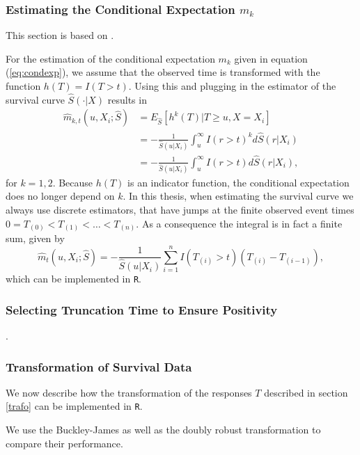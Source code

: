 \documentclass[12pt, a4paper]{scrartcl}
\theoremstyle{definition}
\theoremstyle{plain}
\numberwithin{equation}{section}
\numberwithin{figure}{section}
\numberwithin{table}{section}
\begin{document}
	\subsubsection{Estimating the Conditional Expectation $m_k$}
	
	This section is based on \citet*{drtrees}.
	
	For the estimation of the conditional expectation $m_k$ given in equation (\ref{eq:condexp}), we assume that the observed time is transformed with the function $h(T) = I(T>t)$.
	Using this and plugging in the estimator of the survival curve $\hat{S}(\cdot\vert X)$ results in
	\begin{equation*}
	\begin{split}
	\hat{m}_{k,t} (u, X_i; \hat{S}) &= E_{\hat{S}}[h^k(T)\vert T \geq u, X=X_i]\\
	&=-\frac{1}{\hat{S}(u\vert X_i)}\int_u^{\infty}I(r> t)^kd\hat{S}(r\vert X_i)\\
	&=-\frac{1}{\hat{S}(u\vert X_i)}\int_u^{\infty}I(r> t)d\hat{S}(r\vert X_i),
	\end{split}
	\end{equation*}
	for $k=1,2$.
	Because $h(T)$ is an indicator function, the conditional expectation does no longer depend on $k$.
	In this thesis, when estimating the survival curve we always use discrete estimators, that have jumps at the finite observed event times $0=T_{(0)}<T_{(1)}<\dots<T_{(n)}$.
	As a consequence the integral is in fact a finite sum, given by
	\begin{equation*}
	\hat{m}_t (u, X_i; \hat{S}) = -\frac{1}{\hat{S}(u\vert X_i)}\sum_{i=1}^n I(T_{(i)}>t)(T_{(i)}-T_{(i-1)}),
	\end{equation*}
	which can be implemented in \texttt{R}.
	
	\subsubsection{Selecting Truncation Time to Ensure Positivity}
	
	\citet*{drtrees}.
	
	\subsubsection{Transformation of Survival Data}
	
	We now describe how the transformation of the responses $T$ described in section \ref{trafo} can be implemented in \texttt{R}.
	
	We use the Buckley-James as well as the doubly robust transformation to compare their performance.
	
\end{document}
